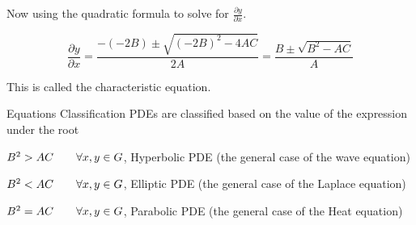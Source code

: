 \documentclass[]{article}
\begin{document}
Now using the quadratic formula to solve for $\displaystyle \frac{\partial y}{\partial x}$.

\[
    \frac{\partial y}{\partial x} = \frac{-\left(-2B\right)\pm\sqrt{{(-2B)}^2 -4AC}}{2A} = \frac{B\pm\sqrt{B^2 -AC}}{A}    
\]

This is called the characteristic equation.

\begin{enrichment*}{Equations Classification}
PDEs are classified based on the value of the expression under the root

$B^2 > AC \quad\quad \forall x,y\in G$, Hyperbolic PDE (the general case of the wave equation) 

$B^2 < AC \quad\quad \forall x,y\in G$, Elliptic PDE (the general case of the Laplace equation) 

$B^2 = AC \quad\quad \forall x,y\in G$, Parabolic PDE (the general case of the Heat equation) 
\end{enrichment*}
\end{document}
